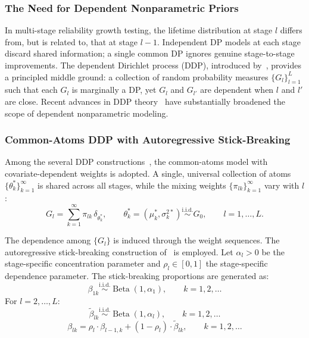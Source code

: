 \documentclass[a4paper,fleqn,longmktitle]{cas-sc}
\DeclareMathOperator{\Be}{Beta}
\newcommand{\iid}{\overset{\text{i.i.d.}}{\sim}}
\begin{document}
\subsubsection{The Need for Dependent Nonparametric Priors}

In multi-stage reliability growth testing, the lifetime distribution at stage $l$ differs from, but is related to, that at stage $l-1$. Independent DP models at each stage discard shared information; a single common DP ignores genuine stage-to-stage improvements. The dependent Dirichlet process (DDP), introduced by~\cite{MacEachern1999,MacEachern2000}, provides a principled middle ground: a collection of random probability measures $\{G_l\}_{l=1}^{L}$ such that each $G_l$ is marginally a DP, yet $G_l$ and $G_{l'}$ are dependent when $l$ and $l'$ are close. Recent advances in DDP theory~\cite{Quintana2022,Iturriaga2024,Bassetti2024} have substantially broadened the scope of dependent nonparametric modeling.

\subsubsection{Common-Atoms DDP with Autoregressive Stick-Breaking}

Among the several DDP constructions~\cite{Griffin2011,Quintana2022,DAngelo2024}, the common-atoms model with covariate-dependent weights is adopted. A single, universal collection of atoms $\{\theta_k^*\}_{k=1}^{\infty}$ is shared across all stages, while the mixing weights $\{\pi_{lk}\}_{k=1}^{\infty}$ vary with $l$:
\begin{equation}\label{eq:ddp_rep}
    G_l = \sum_{k=1}^{\infty} \pi_{lk} \,\delta_{\theta_k^*}, \qquad
    \theta_k^* = (\mu_k^*, \sigma_k^{2*}) \iid G_0, \qquad l = 1, \ldots, L.
\end{equation}

The dependence among $\{G_l\}$ is induced through the weight sequences. The autoregressive stick-breaking construction of~\cite{Griffin2011} is employed. Let $\alpha_l > 0$ be the stage-specific concentration parameter and $\rho_l \in [0,1]$ the stage-specific dependence parameter. The stick-breaking proportions are generated as:
\begin{equation}\label{eq:ddp_stick_l1}
    \beta_{1k} \iid \Be(1, \alpha_1), \qquad k = 1, 2, \ldots
\end{equation}
For $l = 2, \ldots, L$:
\begin{equation}\label{eq:ddp_stick_innov}
    \tilde{\beta}_{lk} \iid \Be(1, \alpha_l), \qquad k = 1, 2, \ldots
\end{equation}
\begin{equation}\label{eq:ddp_stick_ar}
    \beta_{lk} = \rho_l \cdot \beta_{l-1,k} + (1 - \rho_l) \cdot \tilde{\beta}_{lk}, \qquad k = 1, 2, \ldots
\end{equation}
\end{document}
